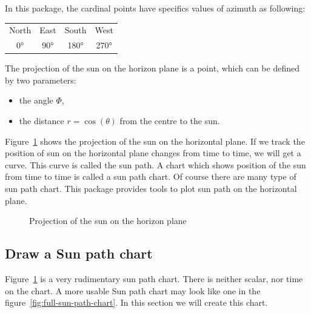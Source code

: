 In this package, the cardinal points have specifics values of azimuth as following:

\begin{tabular}{c c c c}
North & East & South & West \\
0°    & 90°  & 180°  & 270°
\end{tabular}


The projection of the sun on the horizon plane is a point, which can be defined by two parameters:
\begin{itemize}
\item the angle $\Phi$,
\item the distance $r = \cos(\theta)$ from the centre to the sun.
\end{itemize}

Figure~\ref{fig:sun-projection} shows the projection of the sun on the horizontal plane.
If we track the position of sun on the horizontal plane changes from time to time, we will get a curve.
This curve is called the sun path. 
A chart which shows position of the sun from time to time is called a sun path chart.
Of course there are many type of sun path chart. 
This package provides tools to plot sun path on the horizontal plane.

\begin{figure}[H]
\centering
{}
\caption{Projection of the sun on the horizon plane}
\label{fig:sun-projection}
\end{figure}

\subsection{Draw a Sun path chart}

Figure~\ref{fig:sun-projection} is a very rudimentary sun path chart.
There is neither scalar, nor time on the chart. 
A more usable Sun path chart may look like one in the figure~\ref{fig:full-sun-path-chart}.
In this section we will create this chart.


